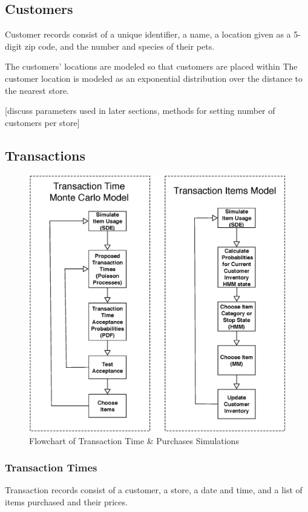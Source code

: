 \documentclass[conference]{IEEEtran}
\begin{document}
\subsection{Customers}

Customer records consist of a unique identifier, a name, a location given as a 5-digit zip code, and the number and species of their pets.

The customers’ locations are modeled so that customers are placed within  The customer location is modeled as an exponential distribution over the distance to the nearest store.

[discuss parameters used in later sections, methods for setting number of customers per store]

\subsection{Transactions}

\begin{figure}[!t]
  \centering
  \includegraphics[width=5.0in]{figures/transaction_modelseps.eps}
  \caption{Flowchart of Transaction Time \& Purchases Simulations}
  \label{fig:fig_sim}
\end{figure}

\subsubsection{Transaction Times}
Transaction records consist of a customer, a store, a date and time, and a list of items purchased and their prices.  
\end{document}
